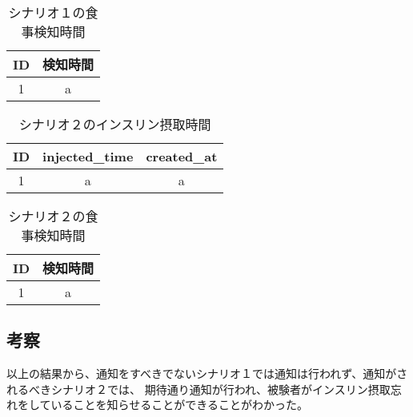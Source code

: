 \begin{table}[htbp]
  \caption{シナリオ１の食事検知時間}
  \label{tb:scenario_1_meal}
  \begin{center}
    \begin{tabular}{|c||c|}
      \hline
      ID  & 検知時間 \\
      \hline\hline
      1 & a \\\hline
    \end{tabular}
  \end{center}
\end{table}

\begin{table}[htbp]
  \caption{シナリオ２のインスリン摂取時間}
  \label{tb:scenario_1_insulin}
  \begin{center}
    \begin{tabular}{|c||c|c|}
      \hline
      ID  & injected\_time & created\_at \\
      \hline\hline
      1 & a & a \\\hline
    \end{tabular}
  \end{center}
\end{table}

\begin{table}[htbp]
  \caption{シナリオ２の食事検知時間}
  \label{tb:scenario_2_meal}
  \begin{center}
    \begin{tabular}{|c||c|}
      \hline
      ID  & 検知時間 \\
      \hline\hline
      1 &  a \\\hline
    \end{tabular}
  \end{center}
\end{table}

\subsection{考察}

以上の結果から、通知をすべきでないシナリオ１では通知は行われず、通知がされるべきシナリオ２では、
期待通り通知が行われ、被験者がインスリン摂取忘れをしていることを知らせることができることがわかった。

